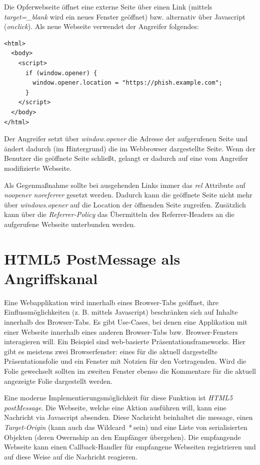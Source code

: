 Die Opferwebseite öffnet eine externe Seite über einen Link (mittels \textit{target=\_blank} wird ein neues Fenster geöffnet) bzw. alternativ über Javascript (\textit{onclick}). Als neue Webseite verwendet der Angreifer folgendes:

\begin{verbatim}
<html>
  <body>
    <script>
      if (window.opener) {
        window.opener.location = "https://phish.example.com";
      }
    </script>
  </body>
</html>
\end{verbatim}

Der Angreifer setzt über \textit{window.opener} die Adresse der aufgerufenen Seite und ändert dadurch (im Hintergrund) die im Webbrowser dargestellte Seite. Wenn der Benutzer die geöffnete Seite schließt, gelangt er dadurch auf eine vom Angreifer modifizierte Webseite.

Als Gegenmaßnahme sollte bei ausgehenden Links immer das \textit{rel} Attribute auf \textit{noopener noreferrer} gesetzt werden. Dadurch kann die geöffnete Seite nicht mehr über \textit{windows.opener} auf die Location der öffnenden Seite zugreifen. Zusätzlich kann über die \textit{Referrer-Policy} das Übermitteln des Referrer-Headers an die aufgerufene Webseite unterbunden werden.

\section{HTML5 PostMessage als Angriffskanal}

Eine Webapplikation wird innerhalb eines Browser-Tabs geöffnet, ihre Einflussmöglichkeiten (z. B. mittels Javascript) beschränken sich auf Inhalte innerhalb des Browser-Tabs. Es gibt Use-Cases, bei denen eine Applikation mit einer Webseite innerhalb eines anderen Browser-Tabs bzw. Browser-Fensters interagieren will. Ein Beispiel sind web-basierte Präsentationsframeworks. Hier gibt es meistens zwei Browserfenster: eines für die aktuell dargestellte Präsentationsfolie und ein Fenster mit Notzien für den Vortragenden. Wird die Folie gewechselt sollten im zweiten Fenster ebenso die Kommentare für die aktuell angezeigte Folie dargestellt werden.

Eine moderne Implementierungsmöglichkeit für diese Funktion ist \textit{HTML5 postMessage}. Die Webseite, welche eine Aktion ausführen will, kann eine Nachricht via Javascript absenden. Diese Nachricht beinhaltet die message, einen \textit{Target-Origin} (kann auch das Wildcard \textit{*} sein) und eine Liste von serialisierten Objekten (deren Owernship an den Empfänger übergehen). Die empfangende Webseite kann einen Callback-Handler für empfangene Webseiten registrieren und auf diese Weise auf die Nachricht reagieren.

